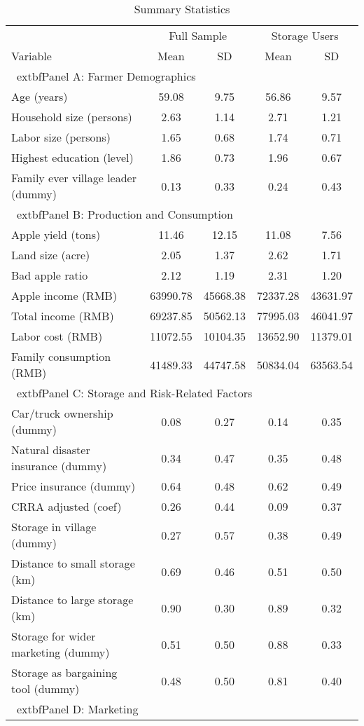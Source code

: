 \begin{table}[htbp]
\centering
\caption{Summary Statistics}
\begin{tabular}{lcccc}
\hline
& \multicolumn{2}{c}{Full Sample} & \multicolumn{2}{c}{Storage Users} \\
\cline{2-3} \cline{4-5}
Variable & Mean & SD & Mean & SD \\
\hline
\multicolumn{5}{l}{\	extbf{Panel A: Farmer Demographics}} \\

Age (years) & 59.08 & 9.75 & 56.86 & 9.57 \\ 
Household size (persons) & 2.63 & 1.14 & 2.71 & 1.21 \\ 
Labor size (persons) & 1.65 & 0.68 & 1.74 & 0.71 \\ 
Highest education (level) & 1.86 & 0.73 & 1.96 & 0.67 \\ 
Family ever village leader (dummy) & 0.13 & 0.33 & 0.24 & 0.43 \\ 
\hline
\multicolumn{5}{l}{\	extbf{Panel B: Production and Consumption}} \\

Apple yield (tons) & 11.46 & 12.15 & 11.08 & 7.56 \\ 
Land size (acre) & 2.05 & 1.37 & 2.62 & 1.71 \\ 
Bad apple ratio & 2.12 & 1.19 & 2.31 & 1.20 \\ 
Apple income (RMB) & 63990.78 & 45668.38 & 72337.28 & 43631.97 \\ 
Total income (RMB) & 69237.85 & 50562.13 & 77995.03 & 46041.97 \\ 
Labor cost (RMB) & 11072.55 & 10104.35 & 13652.90 & 11379.01 \\ 
Family consumption (RMB) & 41489.33 & 44747.58 & 50834.04 & 63563.54 \\ 
\hline
\multicolumn{5}{l}{\	extbf{Panel C: Storage and Risk-Related Factors}} \\

Car/truck ownership (dummy) & 0.08 & 0.27 & 0.14 & 0.35 \\ 
Natural disaster insurance (dummy) & 0.34 & 0.47 & 0.35 & 0.48 \\ 
Price insurance (dummy) & 0.64 & 0.48 & 0.62 & 0.49 \\ 
CRRA adjusted (coef) & 0.26 & 0.44 & 0.09 & 0.37 \\ 
Storage in village (dummy) & 0.27 & 0.57 & 0.38 & 0.49 \\ 
Distance to small storage (km) & 0.69 & 0.46 & 0.51 & 0.50 \\ 
Distance to large storage (km) & 0.90 & 0.30 & 0.89 & 0.32 \\ 
Storage for wider marketing (dummy) & 0.51 & 0.50 & 0.88 & 0.33 \\ 
Storage as bargaining tool (dummy) & 0.48 & 0.50 & 0.81 & 0.40 \\ 
\hline
\multicolumn{5}{l}{\	extbf{Panel D: Marketing}} \\


\end{tabular}
\end{table}
